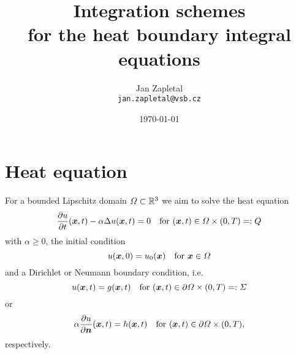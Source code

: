\documentclass[a4paper,11pt]{article}
\title{\sffamily\bfseries Integration schemes \\ for the heat boundary integral equations}
\author{Jan Zapletal\\\texttt{jan.zapletal@vsb.cz}}
\date{\today}
\begin{document}

\maketitle
\thispagestyle{empty}
\vfill
\tableofcontents
\thispagestyle{empty}
\vfill
\newpage

\pagestyle{plain}
\setcounter{page}{1}

\section{Heat equation}


For a bounded Lipschitz domain $\Omega \subset {\mathbb{R}}^3$ we aim to solve the heat equation \cite{Mes2014,MesSchTau2014,MesSchTau2015}
\begin{equation}
  \label{eq:heat_eq}
  \frac{\partial u}{\partial t}(\vx,t) - \alpha \upDelta u(\vx,t) = 0 \quad\text{for } (\vx,t) \in \Omega \times (0,T) =: Q
\end{equation}
with $\alpha \geq 0$, the initial condition
\begin{equation*}
  u({{\bm{x}}},0) = u_0({{\bm{x}}}) \quad\text{for }{\ensuremath{{\bm{x}}}} \in \Omega
\end{equation*}
and a Dirichlet or Neumann boundary condition, i.e.
\begin{equation*}
  u({{\bm{x}}},t) = g({{\bm{x}}},t) \quad\text{for }({{\bm{x}}},t) \in \partial\Omega \times (0,T) =: \Sigma
\end{equation*}
or
\begin{equation*}
  \alpha\frac{\partial u}{\partial {\ensuremath{{\bm{n}}}}}({{\bm{x}}},t) = h({{\bm{x}}},t) \quad\text{for }({{\bm{x}}},t) \in \partial\Omega \times (0,T),
\end{equation*}
respectively.
\end{document}
